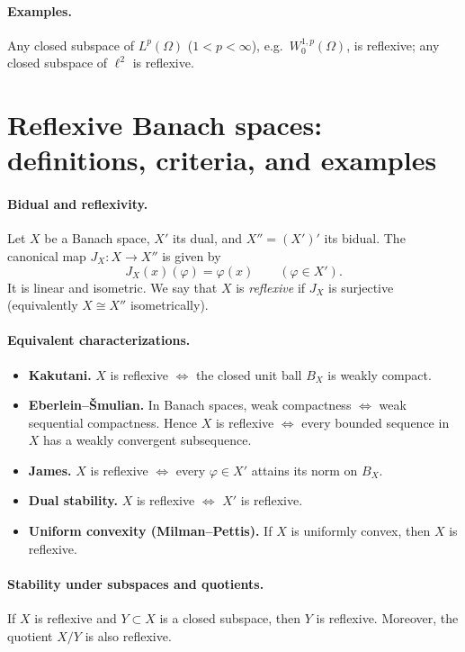 \documentclass[12pt,a4paper]{article}
\theoremstyle{plain}
\theoremstyle{definition}
\theoremstyle{remark}
\theoremstyle{remark}
\theoremstyle{definition}
\begin{document}
	\paragraph{Examples.}
	Any closed subspace of $L^p(\Omega)$ ($1<p<\infty$), e.g.\ $W^{1,p}_0(\Omega)$, is reflexive; 
	any closed subspace of $\ell^2$ is reflexive.
	
	\section*{Reflexive Banach spaces: definitions, criteria, and examples}
	
	\paragraph{Bidual and reflexivity.}
	Let $X$ be a Banach space, $X'$ its dual, and $X''=(X')'$ its bidual.
	The canonical map $J_X:X\to X''$ is given by
	\[
	J_X(x)(\varphi)=\varphi(x)\qquad(\varphi\in X').
	\]
	It is linear and isometric. We say that $X$ is \emph{reflexive} if $J_X$ is surjective
	(equivalently $X\cong X''$ isometrically).
	
	\paragraph{Equivalent characterizations.}
	\begin{itemize}
		\item \textbf{Kakutani.} $X$ is reflexive $\iff$ the closed unit ball $B_X$ is weakly compact.
		\item \textbf{Eberlein--\v{S}mulian.} In Banach spaces, weak compactness $\iff$ weak sequential compactness.
		Hence $X$ is reflexive $\iff$ every bounded sequence in $X$ has a weakly convergent subsequence.
		\item \textbf{James.} $X$ is reflexive $\iff$ every $\varphi\in X'$ attains its norm on $B_X$.
		\item \textbf{Dual stability.} $X$ is reflexive $\iff$ $X'$ is reflexive.
		\item \textbf{Uniform convexity (Milman--Pettis).} If $X$ is uniformly convex, then $X$ is reflexive.
	\end{itemize}
	
	\paragraph{Stability under subspaces and quotients.}
	If $X$ is reflexive and $Y\subset X$ is a closed subspace, then $Y$ is reflexive.
	Moreover, the quotient $X/Y$ is also reflexive.
	
\end{document}
